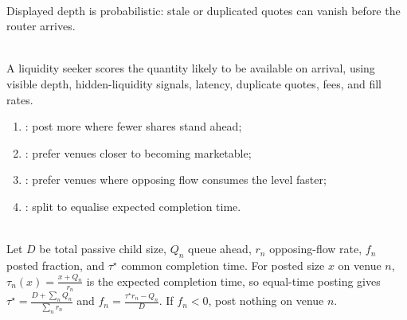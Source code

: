 \documentclass[a4paper,oneside,openany]{book}
\begin{document}
\begin{caveat} \\
Displayed depth is probabilistic: stale or duplicated quotes can vanish before the router arrives.
\end{caveat}

\begin{principle} \\
A liquidity seeker scores the quantity likely to be available on arrival, using visible depth, hidden-liquidity signals, latency, duplicate quotes, fees, and fill rates.
\end{principle}

\begin{taxonomy} 
\begin{enumerate}[label=\roman*.]
\setlength{\itemsep}{0pt}
\item {}: post more where fewer shares stand ahead;
\item {}: prefer venues closer to becoming marketable;
\item {}: prefer venues where opposing flow consumes the level faster;
\item {}: split to equalise expected completion time.
\end{enumerate}
\end{taxonomy}

\begin{definition} \\
Let $D$ be total passive child size, $Q_n$ queue ahead, $r_n$ opposing-flow rate, $f_n$ posted fraction, and $\tau^\star$ common completion time. For posted size $x$ on venue $n$, $\tau_n(x)=\frac{x+Q_n}{r_n}$ is the expected completion time, so equal-time posting gives $\tau^\star=\frac{D+\sum_n Q_n}{\sum_n r_n}$ and $f_n=\frac{\tau^\star r_n-Q_n}{D}$. If $f_n<0$, post nothing on venue $n$.
\end{definition}
\end{document}
